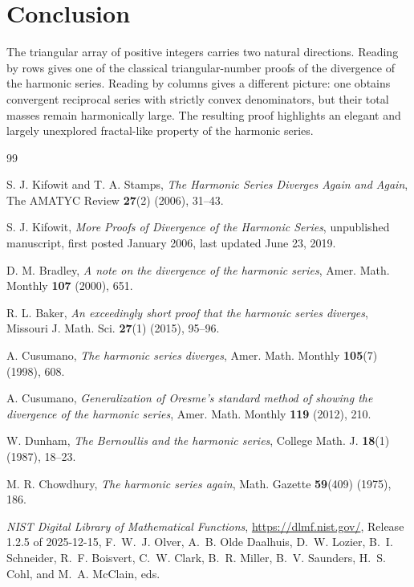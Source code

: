 \documentclass[11pt]{article}
\begin{document}
\section{Conclusion}

The triangular array of positive integers carries two natural directions. Reading by rows gives one of the classical triangular-number proofs of the divergence of the harmonic series. Reading by columns gives a different picture: one obtains convergent reciprocal series with strictly convex denominators, but their total masses remain harmonically large. The resulting proof highlights an elegant and largely unexplored fractal-like property of the harmonic series.
\begin{thebibliography}{99}

S. J. Kifowit and T. A. Stamps,
\emph{The Harmonic Series Diverges Again and Again},
The AMATYC Review \textbf{27}(2) (2006), 31--43.

S. J. Kifowit,
\emph{More Proofs of Divergence of the Harmonic Series},
unpublished manuscript, first posted January 2006, last updated June 23, 2019.

D. M. Bradley,
\emph{A note on the divergence of the harmonic series},
Amer. Math. Monthly \textbf{107} (2000), 651.

R. L. Baker,
\emph{An exceedingly short proof that the harmonic series diverges},
Missouri J. Math. Sci. \textbf{27}(1) (2015), 95--96.

A. Cusumano,
\emph{The harmonic series diverges},
Amer. Math. Monthly \textbf{105}(7) (1998), 608.

A. Cusumano,
\emph{Generalization of Oresme's standard method of showing the divergence of the harmonic series},
Amer. Math. Monthly \textbf{119} (2012), 210.

W. Dunham,
\emph{The Bernoullis and the harmonic series},
College Math. J. \textbf{18}(1) (1987), 18--23.

M. R. Chowdhury,
\emph{The harmonic series again},
Math. Gazette \textbf{59}(409) (1975), 186.

\emph{NIST Digital Library of Mathematical Functions},
\url{https://dlmf.nist.gov/},
Release 1.2.5 of 2025-12-15,
F.~W.~J. Olver, A.~B. Olde Daalhuis, D.~W. Lozier, B.~I. Schneider,
R.~F. Boisvert, C.~W. Clark, B.~R. Miller, B.~V. Saunders,
H.~S. Cohl, and M.~A. McClain, eds.

\end{thebibliography}
\end{document}
